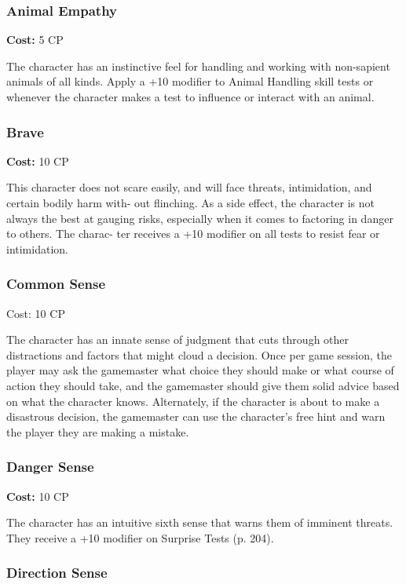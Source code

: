 \subsubsection{Animal Empathy}

\textbf{Cost:} 5 CP

The character has an instinctive feel for handling 
and working with non-sapient animals of all kinds. 
Apply a +10 modifier to Animal Handling skill tests 
or whenever the character makes a test to influence or 
interact with an animal.

\subsubsection{Brave}

\textbf{Cost:} 10 CP

This character does not scare easily, and will face 
threats, intimidation, and certain bodily harm with-
out flinching. As a side effect, the character is not 
always the best at gauging risks, especially when it 
comes to factoring in danger to others. The charac-
ter receives a +10 modifier on all tests to resist fear 
or intimidation.

\subsubsection{Common Sense}

Cost: 10 CP

The character has an innate sense of judgment that 
cuts through other distractions and factors that might 
cloud a decision. Once per game session, the player 
may ask the gamemaster what choice they should 
make or what course of action they should take, and 
the gamemaster should give them solid advice based 
on what the character knows. Alternately, if the 
character is about to make a disastrous decision, the 
gamemaster can use the character's free hint and warn 
the player they are making a mistake.

\subsubsection{Danger Sense}

\textbf{Cost:} 10 CP

The character has an intuitive sixth sense that warns 
them of imminent threats. They receive a +10 modifier 
on Surprise Tests (p. 204).

\subsubsection{Direction Sense}

